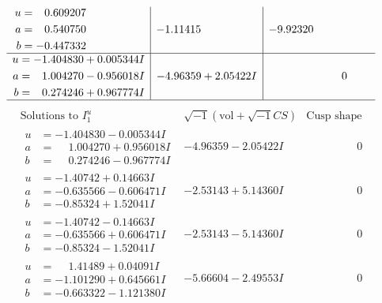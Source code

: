 \documentclass[1p]{elsarticle_modified}
\theoremstyle{definition}
\newcommand{\I}{\sqrt{-1}}
\begin{document}
$$\begin{array}{c|c|c}
\begin{aligned}
u &= \phantom{-}0.609207\phantom{ +0.000000I} \\
a &= \phantom{-}0.540750\phantom{ +0.000000I} \\
b &= -0.447332\phantom{ +0.000000I}\end{aligned}
 & -1.11415\phantom{ +0.000000I} & -9.92320\phantom{ +0.000000I} \\ \hline\begin{aligned}
u &= -1.404830 + 0.005344 I \\
a &= \phantom{-}1.004270 - 0.956018 I \\
b &= \phantom{-}0.274246 + 0.967774 I\end{aligned}
 & -4.96359 + 2.05422 I & \phantom{-0.000000 } 0\\
 \hline 
 \end{array}$$\newpage$$\begin{array}{c|c|c}  
\text{Solutions to }I^u_{1}& \I (\text{vol} + \sqrt{-1}CS) & \text{Cusp shape}\\
 \hline 
\begin{aligned}
u &= -1.404830 - 0.005344 I \\
a &= \phantom{-}1.004270 + 0.956018 I \\
b &= \phantom{-}0.274246 - 0.967774 I\end{aligned}
 & -4.96359 - 2.05422 I & \phantom{-0.000000 } 0 \\ \hline\begin{aligned}
u &= -1.40742 + 0.14663 I \\
a &= -0.635566 - 0.606471 I \\
b &= -0.85324 + 1.52041 I\end{aligned}
 & -2.53143 + 5.14360 I & \phantom{-0.000000 } 0 \\ \hline\begin{aligned}
u &= -1.40742 - 0.14663 I \\
a &= -0.635566 + 0.606471 I \\
b &= -0.85324 - 1.52041 I\end{aligned}
 & -2.53143 - 5.14360 I & \phantom{-0.000000 } 0 \\ \hline\begin{aligned}
u &= \phantom{-}1.41489 + 0.04091 I \\
a &= -1.101290 + 0.645661 I \\
b &= -0.663322 - 1.121380 I\end{aligned}
 & -5.66604 - 2.49553 I & \phantom{-0.000000 } 0 \\ \hline\begin{aligned}

\end{aligned}
\end{array}$$
\end{document}
